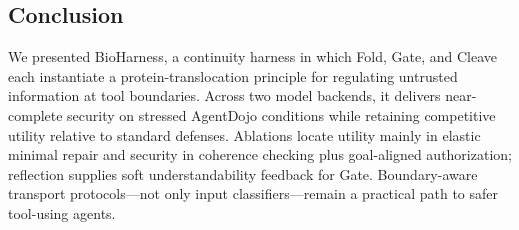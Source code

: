 \subsection{Conclusion}

We presented BioHarness, a continuity harness in which Fold, Gate, and Cleave each instantiate a protein-translocation principle for regulating untrusted information at tool boundaries. Across two model backends, it delivers near-complete security on stressed AgentDojo conditions while retaining competitive utility relative to standard defenses. Ablations locate utility mainly in elastic minimal repair and security in coherence checking plus goal-aligned authorization; reflection supplies soft understandability feedback for Gate. Boundary-aware transport protocols---not only input classifiers---remain a practical path to safer tool-using agents.

